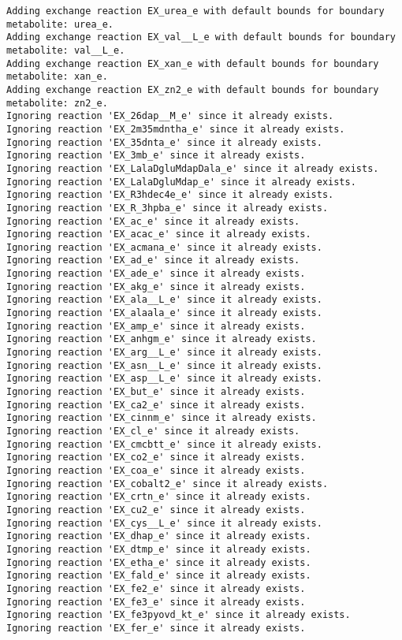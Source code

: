 \documentclass[
  letterpaper,
  DIV=11,
  numbers=noendperiod]{scrartcl}
\begin{document}
\begin{verbatim}
Adding exchange reaction EX_urea_e with default bounds for boundary metabolite: urea_e.
Adding exchange reaction EX_val__L_e with default bounds for boundary metabolite: val__L_e.
Adding exchange reaction EX_xan_e with default bounds for boundary metabolite: xan_e.
Adding exchange reaction EX_zn2_e with default bounds for boundary metabolite: zn2_e.
Ignoring reaction 'EX_26dap__M_e' since it already exists.
Ignoring reaction 'EX_2m35mdntha_e' since it already exists.
Ignoring reaction 'EX_35dnta_e' since it already exists.
Ignoring reaction 'EX_3mb_e' since it already exists.
Ignoring reaction 'EX_LalaDgluMdapDala_e' since it already exists.
Ignoring reaction 'EX_LalaDgluMdap_e' since it already exists.
Ignoring reaction 'EX_R3hdec4e_e' since it already exists.
Ignoring reaction 'EX_R_3hpba_e' since it already exists.
Ignoring reaction 'EX_ac_e' since it already exists.
Ignoring reaction 'EX_acac_e' since it already exists.
Ignoring reaction 'EX_acmana_e' since it already exists.
Ignoring reaction 'EX_ad_e' since it already exists.
Ignoring reaction 'EX_ade_e' since it already exists.
Ignoring reaction 'EX_akg_e' since it already exists.
Ignoring reaction 'EX_ala__L_e' since it already exists.
Ignoring reaction 'EX_alaala_e' since it already exists.
Ignoring reaction 'EX_amp_e' since it already exists.
Ignoring reaction 'EX_anhgm_e' since it already exists.
Ignoring reaction 'EX_arg__L_e' since it already exists.
Ignoring reaction 'EX_asn__L_e' since it already exists.
Ignoring reaction 'EX_asp__L_e' since it already exists.
Ignoring reaction 'EX_but_e' since it already exists.
Ignoring reaction 'EX_ca2_e' since it already exists.
Ignoring reaction 'EX_cinnm_e' since it already exists.
Ignoring reaction 'EX_cl_e' since it already exists.
Ignoring reaction 'EX_cmcbtt_e' since it already exists.
Ignoring reaction 'EX_co2_e' since it already exists.
Ignoring reaction 'EX_coa_e' since it already exists.
Ignoring reaction 'EX_cobalt2_e' since it already exists.
Ignoring reaction 'EX_crtn_e' since it already exists.
Ignoring reaction 'EX_cu2_e' since it already exists.
Ignoring reaction 'EX_cys__L_e' since it already exists.
Ignoring reaction 'EX_dhap_e' since it already exists.
Ignoring reaction 'EX_dtmp_e' since it already exists.
Ignoring reaction 'EX_etha_e' since it already exists.
Ignoring reaction 'EX_fald_e' since it already exists.
Ignoring reaction 'EX_fe2_e' since it already exists.
Ignoring reaction 'EX_fe3_e' since it already exists.
Ignoring reaction 'EX_fe3pyovd_kt_e' since it already exists.
Ignoring reaction 'EX_fer_e' since it already exists.

\end{verbatim}
\end{document}
